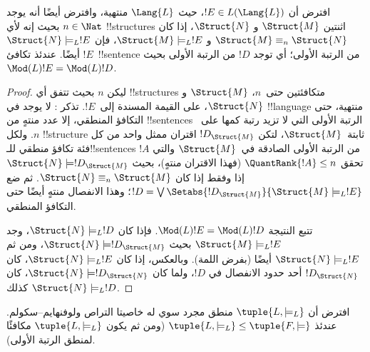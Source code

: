 \documentclass[../../../include/open-logic-section]{subfiles}
\begin{document}


\begin{lem}
افترض أن $!E \in L(\Lang{L})$، حيث $\Lang{L}$ منتهية، وافترض أيضًا أنه
يوجد $n \in \Nat$ بحيث إنه لأي !!{structure}s اثنتين $\Struct{M}$ و
$\Struct{N}$، إذا كان $\Struct{M} \equiv_n \Struct{N}$ و
$\Struct{M} \models_L !E$، فإن $\Struct{N} \models_L !E$ أيضًا.
عندئذ تكافئ $!E$~!!{sentence} من الرتبة الأولى؛ أي توجد $!D$ من الرتبة
الأولى بحيث $\Mod(L){!E}=\Mod(L){!D}$.
\end{lem}

\begin{proof}
ليكن $n$ بحيث تتفق أي !!{structure}s متكافئتين حتى~$n$، $\Struct{M}$
و$\Struct{N}$، على القيمة المسندة إلى~$!E$. تذكر
: لا يوجد في !!{language} منتهية، حتى
التكافؤ المنطقي، إلا عدد منتهٍ من !!{sentence}s الرتبة الأولى التي لا
تزيد رتبة كمها على~$n$. ولكل !!{structure} ثابتة~$\Struct{M}$، لتكن
$!D_{\Struct{M}}$ اقتران ممثل واحد من كل فئة تكافؤ منطقي للـ!!{sentence}s
$!A$ من الرتبة الأولى الصادقة في~$\Struct{M}$ والتي تحقق
$\QuantRank{!A} \le n$ (فهذا الاقتران منتهٍ)، بحيث
$\Struct{N} \models !D_{\Struct{M}}$ إذا وفقط إذا كان
$\Struct{N} \equiv_n \Struct{M}$. ثم ضع
$!D = \textstyle\bigvee
\Setabs{!D_{\Struct{M}}}{\Struct{M} \models_L !E}$؛ وهذا الانفصال منتهٍ
أيضًا حتى التكافؤ المنطقي.

تتبع النتيجة $\Mod(L){!E}=\Mod(L){!D}$. فإذا كان
$\Struct{N} \models_L !D$، وجد $\Struct{M} \models_L !E$ بحيث
$\Struct{N} \models !D_{\Struct{M}}$، ومن ثم
$\Struct{N} \models_L !E$ أيضًا (بفرض اللمة). وبالعكس، إذا كان
$\Struct{N} \models_L !E$، كان $!D_\Struct{N}$ أحد حدود الانفصال في
$!D$، ولما كان $\Struct{N} \models !D_\Struct{N}$، كان كذلك
$\Struct{N} \models_L !D$.
\end{proof}

\begin{thm}
   افترض أن $\tuple{L,\models_L}$ منطق مجرد سوي
  له خاصيتا التراص ولوفنهايم--سكولم. عندئذ
  $\tuple{L,\models_L} \le \tuple{F,\models}$ (ومن ثم يكون
  $\tuple{L,\models_L}$ مكافئًا لمنطق الرتبة الأولى).
\end{thm}
\end{document}
